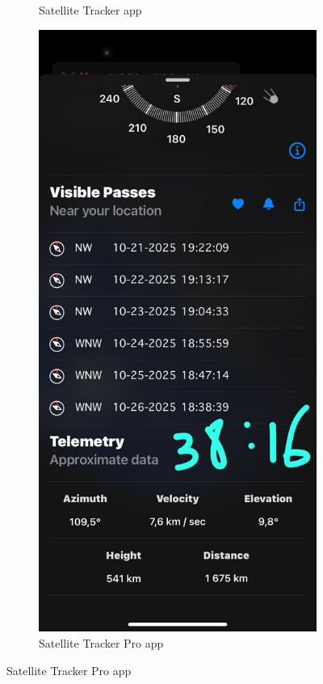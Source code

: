 \documentclass{article}
\begin{document}
\begin{figure}[h!]
\begin{subfigure}[b]{0.4\textwidth}
        \caption{Satellite Tracker app}
        \label{fig:tracker_screenshot}
    \end{subfigure}
    \begin{subfigure}[b]{0.4\textwidth}
        \centering
        \includegraphics[width=\textwidth]{LaTeX/Figures/Satellite_Tracker_Pro_Screenshot.jpg}
        \caption{Satellite Tracker Pro app}
        \label{fig:tracker_pro_screenshot}
    \end{subfigure}
    
\end{figure}
\end{document}
